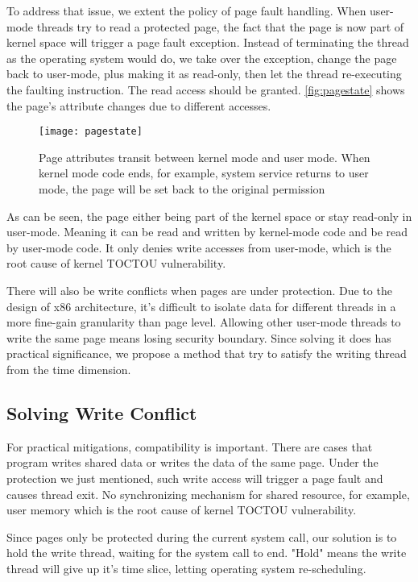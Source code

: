 To address that issue, we extent the policy of page fault handling. When user-mode threads try to read a protected page, the fact that the page is now part of kernel space will trigger a page fault exception. Instead of terminating  the thread as the operating system would do, we take over the exception, change the page back to user-mode, plus making it as read-only, then let the thread re-executing the faulting instruction. The read access should be granted. \autoref{fig:pagestate} shows the page's attribute changes due to different accesses.
 

\begin{figure}[th]
  \texttt{[image: pagestate]}
  \centering
  \caption{Page attributes transit between kernel mode and user mode. When kernel mode code ends, for example, system service returns to user mode, the page will be set back to the original permission}
  \label{fig:pagestate}
\end{figure}

As can be seen, the page either being part of the kernel space or stay read-only in user-mode. Meaning it can be read and written by kernel-mode code and be read by user-mode code. It only denies write accesses from user-mode, which is the root cause of kernel TOCTOU vulnerability.


There will also be write conflicts when pages are under protection. Due to the design of x86 architecture, it's difficult to isolate data for different threads in a more fine-gain granularity than page level. Allowing other user-mode threads to write the same page means losing security boundary. Since solving it does has practical significance, we propose a method that try to satisfy the writing thread from the time dimension.


\subsection{Solving Write Conflict }

For practical mitigations, compatibility is important. There are cases that program writes shared data or writes the data of the same page. Under the protection we just mentioned, such write access will trigger a page fault and causes thread exit. No synchronizing mechanism for shared resource, for example, user memory which is the root cause of kernel TOCTOU vulnerability. 

Since pages only be protected during the current system call, our solution is to hold the write thread, waiting for the system call to end. "Hold" means the write thread will give up it's time slice, letting operating system re-scheduling. 

